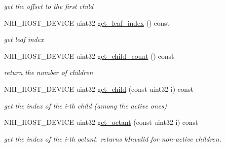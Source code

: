 \begin{DoxyCompactItemize}
\begin{DoxyCompactList}\small\item\em get the offset to the first child \end{DoxyCompactList}\item 
\hypertarget{structnih_1_1_octree__node__base_afaf0c44101283dfff35ff05539972624}{
\-N\-I\-H\-\_\-\-H\-O\-S\-T\-\_\-\-D\-E\-V\-I\-C\-E uint32 \hyperlink{structnih_1_1_octree__node__base_afaf0c44101283dfff35ff05539972624}{get\-\_\-leaf\-\_\-index} () const }
\label{structnih_1_1_octree__node__base_afaf0c44101283dfff35ff05539972624}

\begin{DoxyCompactList}\small\item\em get leaf index \end{DoxyCompactList}\item 
\hypertarget{structnih_1_1_octree__node__base_a064a601aef2351dadaa9a385d36da7d5}{
\-N\-I\-H\-\_\-\-H\-O\-S\-T\-\_\-\-D\-E\-V\-I\-C\-E uint32 \hyperlink{structnih_1_1_octree__node__base_a064a601aef2351dadaa9a385d36da7d5}{get\-\_\-child\-\_\-count} () const }
\label{structnih_1_1_octree__node__base_a064a601aef2351dadaa9a385d36da7d5}

\begin{DoxyCompactList}\small\item\em return the number of children \end{DoxyCompactList}\item 
\hypertarget{structnih_1_1_octree__node__base_a11465fd5de6e933a4e3018d2b7502a48}{
\-N\-I\-H\-\_\-\-H\-O\-S\-T\-\_\-\-D\-E\-V\-I\-C\-E uint32 \hyperlink{structnih_1_1_octree__node__base_a11465fd5de6e933a4e3018d2b7502a48}{get\-\_\-child} (const uint32 i) const }
\label{structnih_1_1_octree__node__base_a11465fd5de6e933a4e3018d2b7502a48}

\begin{DoxyCompactList}\small\item\em get the index of the i-\/th child (among the active ones) \end{DoxyCompactList}\item 
\hypertarget{structnih_1_1_octree__node__base_a9d70c9b58ab2834d18bf034b1ffc1e02}{
\-N\-I\-H\-\_\-\-H\-O\-S\-T\-\_\-\-D\-E\-V\-I\-C\-E uint32 \hyperlink{structnih_1_1_octree__node__base_a9d70c9b58ab2834d18bf034b1ffc1e02}{get\-\_\-octant} (const uint32 i) const }
\label{structnih_1_1_octree__node__base_a9d70c9b58ab2834d18bf034b1ffc1e02}

\begin{DoxyCompactList}\small\item\em get the index of the i-\/th octant. returns k\-Invalid for non-\/active children. \end{DoxyCompactList}\end{DoxyCompactItemize}
